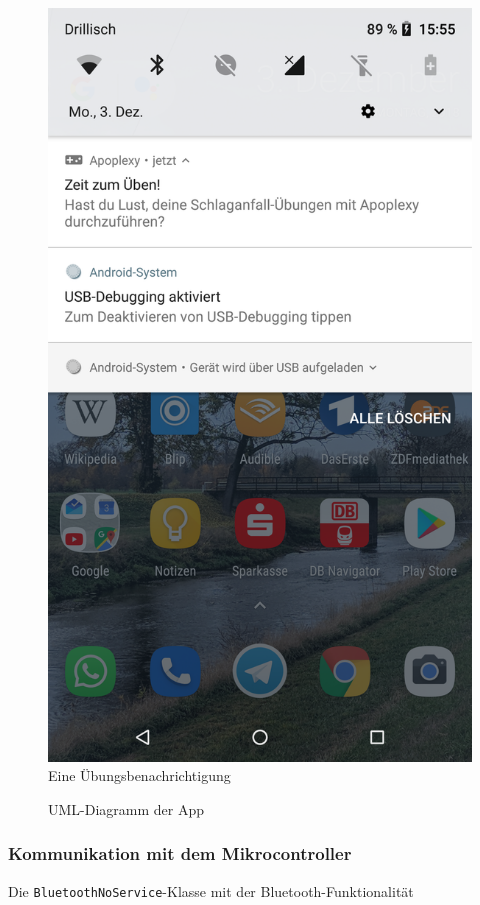 \begin{multicols}{2}
\begin{figure}[H]
	\includegraphics[scale=0.1]{pics/device-notification.png}
	\caption{Eine Übungsbenachrichtigung}
\end{figure}
\end{multicols}

\begin{figure}[H]
	\centering
	
	\caption{UML-Diagramm der App}
\end{figure}

\tocless\subsubsection{Kommunikation mit dem Mikrocontroller}
\begin{longlisting}
	\caption{Die \texttt{BluetoothNoService}-Klasse mit der Bluetooth-Funktionalität}
	\label{listing:bluetooth}
\end{longlisting}

